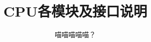 \documentclass{article}
\title{CPU各模块及接口说明}
\author{喵喵喵喵喵？}
\makeatletter
\newcommand\newtag[2]{#1\def\@currentlabel{#1}\label{#2}}
\newcommand{\labelname}[1]{%
  \def\@currentlabelname{#1}}%
\makeatother
\begin{document}
\begin{comment}
普通的tabular环境：
\begin{table}
    \centering
    \small
    \begin{tabular}{lllllp{2cm}}
    \toprule
    方向 & 名称 & 类型 & 宽度 & 连接到 & 详细描述 \\ \midrule
    in & rst\label{REGISTERS:rst} & STD_LOGIC & 1 & \nameref{sec:MIPS_CPU} & 复位信号 \\
    in & clk\label{REGISTERS:clk} & STD_LOGIC & 1 & \nameref{sec:MIPS_CPU} & 时钟信号 \\

    \bottomrule
    \end{tabular}
    \caption {PC的接口}
\end{table}

可以换页的tabular环境：
\begin{center}
    \tablecaption{PC的接口}

    \tablefirsthead{
        \toprule
        \multicolumn{1}{l}{方向} &
        \multicolumn{1}{l}{名称} &
        \multicolumn{1}{l}{类型} &
        \multicolumn{1}{l}{宽度} &
        \multicolumn{1}{l}{连接到} &
        \multicolumn{1}{l}{详细描述} \\
        \midrule }

    \tablehead{
        \toprule
        \multicolumn{1}{l}{方向} &
        \multicolumn{1}{l}{名称} &
        \multicolumn{1}{l}{类型} &
        \multicolumn{1}{l}{宽度} &
        \multicolumn{1}{l}{连接到} &
        \multicolumn{1}{l}{详细描述} \\
        \midrule }

    \tabletail{
        \bottomrule
        \multicolumn{6}{c}{接下页} \\}

    \tablelasttail{\bottomrule}

    \small
    \begin{supertabular}{lllllp{2cm}}

    in & rst\label{REGISTERS:rst} & STD_LOGIC & 1 & \nameref{sec:MIPS_CPU} & 复位信号 \\
    in & clk\label{REGISTERS:clk} & STD_LOGIC & 1 & \nameref{sec:MIPS_CPU} & 时钟信号 \\

    \end{supertabular}
\end{center}

好的使用表格内label的方法：
\labelname{name}\newtag{word}{ref:label}
\end{comment}
\end{document}
